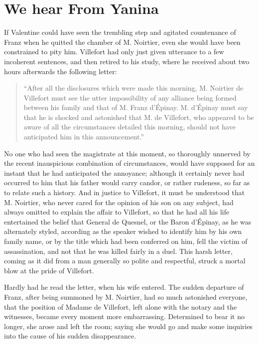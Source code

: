 \chapter{We hear From Yanina}

If Valentine could have seen the trembling step and agitated
countenance of Franz when he quitted the chamber of M. Noirtier, even
she would have been constrained to pity him. Villefort had only just
given utterance to a few incoherent sentences, and then retired to his
study, where he received about two hours afterwards the following
letter:

\begin{quote}
{\small“After all the disclosures which were made this morning, M. Noirtier de
Villefort must see the utter impossibility of any alliance being formed
between his family and that of M. Franz d’Épinay. M. d’Épinay must say
that he is shocked and astonished that M. de Villefort, who appeared to
be aware of all the circumstances detailed this morning, should not
have anticipated him in this announcement.”}
\end{quote}

No one who had seen the magistrate at this moment, so thoroughly
unnerved by the recent inauspicious combination of circumstances, would
have supposed for an instant that he had anticipated the annoyance;
although it certainly never had occurred to him that his father would
carry candor, or rather rudeness, so far as to relate such a history.
And in justice to Villefort, it must be understood that M. Noirtier,
who never cared for the opinion of his son on any subject, had always
omitted to explain the affair to Villefort, so that he had all his life
entertained the belief that General de Quesnel, or the Baron d’Épinay,
as he was alternately styled, according as the speaker wished to
identify him by his own family name, or by the title which had been
conferred on him, fell the victim of assassination, and not that he was
killed fairly in a duel. This harsh letter, coming as it did from a man
generally so polite and respectful, struck a mortal blow at the pride
of Villefort.

Hardly had he read the letter, when his wife entered. The sudden
departure of Franz, after being summoned by M. Noirtier, had so much
astonished everyone, that the position of Madame de Villefort, left
alone with the notary and the witnesses, became every moment more
embarrassing. Determined to bear it no longer, she arose and left the
room; saying she would go and make some inquiries into the cause of his
sudden disappearance.

